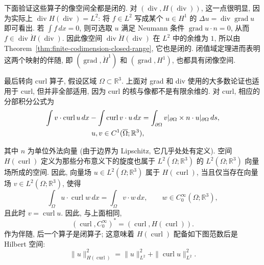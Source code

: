 {下面验证这些算子的像空间全都是闭的. 对 $(\operatorname{div},H(\operatorname{div}))$, 这一点很明显, 因为实际上 $\operatorname{div}H(\operatorname{div})=L^2$: 将 $f\in L^2$ 写成某个 $u\in H^1$ 的 $\Delta u=\operatorname{div}\operatorname{grad}u$ 即可看出. 若 $\int f\,dx=0$, 则可选取 $u$ 满足 Neumann 条件 $\operatorname{grad}u\cdot n=0$, 从而 $f\in\operatorname{div}\mathring H(\operatorname{div})$. 因此像空间 $\operatorname{div}\mathring H(\operatorname{div})$ 在 $L^2$ 中的余维为 $1$, 所以由 Theorem~\ref{thm:finite-codimension-closed-range}, 它也是闭的. 闭值域定理进而表明这两个映射的伴随, 即 $(\operatorname{grad},\mathring H^1)$ 和 $(\operatorname{grad},H^1)$, 也都具有闭像空间.}

{最后转向 curl 算子, 假设区域 $\Omega\subset\mathbb R^3$. 上面对 grad 和 div 使用的大多数论证也适用于 curl, 但并非全部适用, 因为 curl 的核与像都不是有限余维的. 对 curl, 相应的分部积分公式为}
\begin{equation}\label{eq:curl-classical-green}
\begin{aligned}
\int v\cdot\operatorname{curl}u\,dx-\int\operatorname{curl}v\cdot u\,dx&=\int_{\partial\Omega}v|_{\partial\Omega}\times n\cdot u|_{\partial\Omega}\,ds,\\
&\hspace{-7em}u,v\in C^1(\overline\Omega;\mathbb R^3),
\end{aligned}
\end{equation}

{其中 $n$ 为单位外法向量 (由于边界为 Lipschitz, 它几乎处处有定义). 空间 $H(\operatorname{curl})$ 定义为那些分布意义下的旋度也属于 $L^2(\Omega;\mathbb R^3)$ 的 $L^2(\Omega;\mathbb R^3)$ 向量场所成的空间. 因此, 向量场 $u\in L^2(\Omega;\mathbb R^3)$ 属于 $H(\operatorname{curl})$, 当且仅当存在向量场 $v\in L^2(\Omega;\mathbb R^3)$, 使得}
\begin{equation}\label{eq:distributional-curl}
\int_\Omega u\cdot\operatorname{curl}w\,dx=\int_\Omega v\cdot w\,dx,\qquad w\in C_0^\infty(\Omega;\mathbb R^3),
\end{equation}
{且此时 $v=\operatorname{curl}u$. 因此, 与上面相同,}
\[
(\operatorname{curl},C_0^\infty)^*=(\operatorname{curl},H(\operatorname{curl})).
\]
{作为伴随, 后一个算子是闭算子; 这意味着 $H(\operatorname{curl})$ 配备如下图范数后是 Hilbert 空间:}
\[
\|u\|_{H(\operatorname{curl})}^2=\|u\|_{L^2}^2+\|\operatorname{curl}u\|_{L^2}^2.
\]

